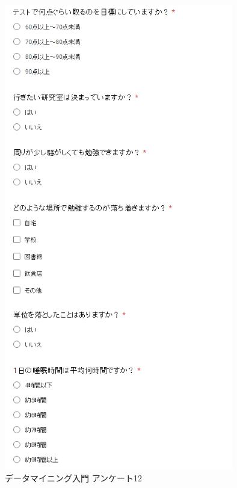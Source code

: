 \begin{figure}[p]
\centering
\includegraphics[width=10cm]{forms15.PNG}
\caption{データマイニング入門 アンケート12}\label{サンプル図}
\end{figure}

